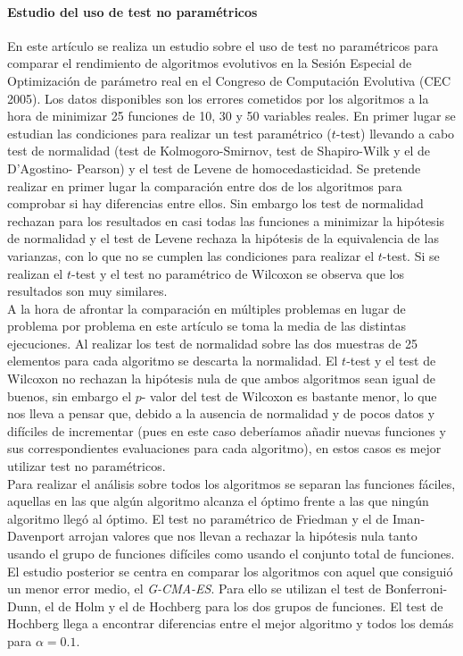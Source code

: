 	\paragraph{Estudio del uso de test no paramétricos} 
	\cite{GARCIA09} En este artículo se realiza un estudio
sobre el uso de test no paramétricos para comparar el 
rendimiento de algoritmos evolutivos en la Sesión Especial de 
Optimización de parámetro real en el Congreso de Computación 
Evolutiva (CEC 2005). Los datos disponibles son los errores 
cometidos por los algoritmos a la hora de minimizar 25 
funciones de 10, 30 y 50 variables reales. En primer lugar se 
estudian las condiciones para realizar un test paramétrico 
($t$-test) llevando a cabo test de normalidad (test de 
Kolmogoro-Smirnov, test de Shapiro-Wilk y el de D'Agostino-
Pearson) y el test de Levene de homocedasticidad. Se 
pretende realizar en primer lugar la comparación entre dos de 
los algoritmos para comprobar si hay diferencias entre ellos. 
Sin embargo los test de normalidad rechazan para los 
resultados en casi todas las funciones a minimizar la 
hipótesis de normalidad y el test de Levene rechaza la 
hipótesis de la equivalencia de las varianzas, con lo que no 
se cumplen las condiciones para realizar el $t$-test. Si se 
realizan el $t$-test y el test no paramétrico de Wilcoxon se 
observa que los resultados son muy similares.\\
	A la hora de afrontar la comparación en múltiples 
problemas en lugar de problema por problema en este artículo 
se toma la media de las distintas ejecuciones. Al realizar 
los test de normalidad sobre las dos muestras de 25 elementos 
para cada algoritmo se descarta la normalidad. El $t$-test y 
el test de Wilcoxon no rechazan la hipótesis nula de que 
ambos algoritmos sean igual de buenos, sin embargo el $p$-
valor del test de Wilcoxon es bastante menor, lo que nos 
lleva a pensar que, debido a la ausencia de normalidad y de 
pocos datos y difíciles de incrementar (pues en este caso 
deberíamos añadir nuevas funciones y sus 
correspondientes evaluaciones para cada algoritmo), en estos 
casos es mejor utilizar test no paramétricos.\\
	Para realizar el análisis sobre todos los algoritmos se 
separan las funciones fáciles, aquellas en las que algún 
algoritmo alcanza el óptimo frente a las que ningún algoritmo 
llegó al óptimo. El test no paramétrico de Friedman y el de 
Iman-Davenport arrojan valores que nos llevan a rechazar la 
hipótesis nula tanto usando el grupo de funciones difíciles 
como usando el conjunto total de funciones.\\
	El estudio posterior se centra en comparar los algoritmos 
con aquel que consiguió un menor error medio, el 
\textit{G-CMA-ES}. Para ello se utilizan el test de 
Bonferroni-Dunn, el de Holm y el de Hochberg para los dos 
grupos de funciones. El test de Hochberg llega a encontrar 
diferencias entre el mejor algoritmo y todos los demás para 
$\alpha=0.1$. 
	
